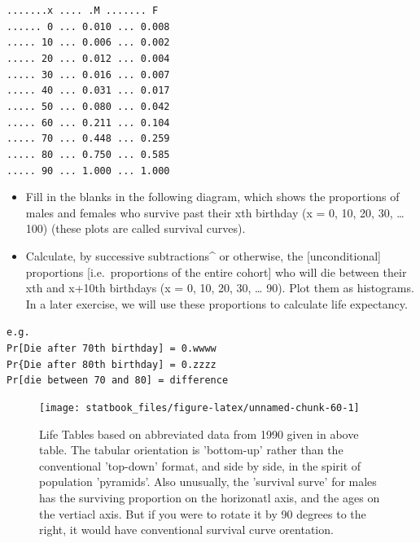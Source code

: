 \documentclass[]{book}
\begin{document}
\texttt{.......x\ ....\ .M\ .......\ F}~\\
\texttt{......\ 0\ ...\ 0.010\ ...\ 0.008}~\\
\texttt{.....\ 10\ ...\ 0.006\ ...\ 0.002}~\\
\texttt{.....\ 20\ ...\ 0.012\ ...\ 0.004}~\\
\texttt{.....\ 30\ ...\ 0.016\ ...\ 0.007}~\\
\texttt{.....\ 40\ ...\ 0.031\ ...\ 0.017}~\\
\texttt{.....\ 50\ ...\ 0.080\ ...\ 0.042}~\\
\texttt{.....\ 60\ ...\ 0.211\ ...\ 0.104}~\\
\texttt{.....\ 70\ ...\ 0.448\ ...\ 0.259}~\\
\texttt{.....\ 80\ ...\ 0.750\ ...\ 0.585}~\\
\texttt{.....\ 90\ ...\ 1.000\ ...\ 1.000}

\begin{itemize}
\item
  Fill in the blanks in the following diagram, which shows the proportions of males and females who survive past their xth birthday (x = 0, 10, 20, 30, \ldots{} 100) (these plots are called survival curves).
\item
  Calculate, by successive subtractions\^{} or otherwise, the {[}unconditional{]} proportions {[}i.e.~proportions of the entire cohort{]} who will die between their xth and x+10th birthdays (x = 0, 10, 20, 30, \ldots{} 90). Plot them as histograms. In a later exercise, we will use these proportions to calculate life expectancy.
\end{itemize}

\texttt{e.g.}\\
\texttt{Pr{[}Die\ after\ 70th\ birthday{]}\ =\ 0.wwww}~\\
\texttt{Pr\{Die\ after\ 80th\ birthday{]}\ =\ 0.zzzz}~\\
\texttt{Pr{[}die\ between\ 70\ and\ 80{]}\ =\ difference}

\begin{figure}

{\centering \texttt{[image: statbook\_files/figure-latex/unnamed-chunk-60-1]} 

}

\caption{Life Tables based on abbreviated data from 1990 given in above table. The tabular orientation is 'bottom-up' rather than the conventional 'top-down' format, and side by side, in the spirit of population 'pyramids'. Also unusually, the 'survival surve' for males has the surviving proportion on the horizonatl axis, and the ages on the vertiacl axis. But if you were to rotate it by 90 degrees to the right, it would have conventional survival curve orentation.  }\label{fig:unnamed-chunk-60}
\end{figure}
\end{document}
